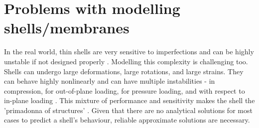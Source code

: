 \section{Problems with modelling shells/membranes}
In the real world, thin shells are very sensitive to imperfections and can be highly unstable if not designed properly \cite{loibl2019}.
 Modelling this complexity is challenging too. Shells can undergo large deformations, large rotations, and large strains.
 They can behave highly nonlinearly and can have multiple instabilities - in compression, for out-of-plane loading, for 
 pressure loading, and with respect to in-plane loading \cite{sauer2014}.
 This mixture of performance and sensitivity makes the shell the 'primadonna of structures' \cite{bischoff2004}. Given that there are
 no analytical solutions for most cases to predict a shell's behaviour, reliable approximate solutions are necessary.


